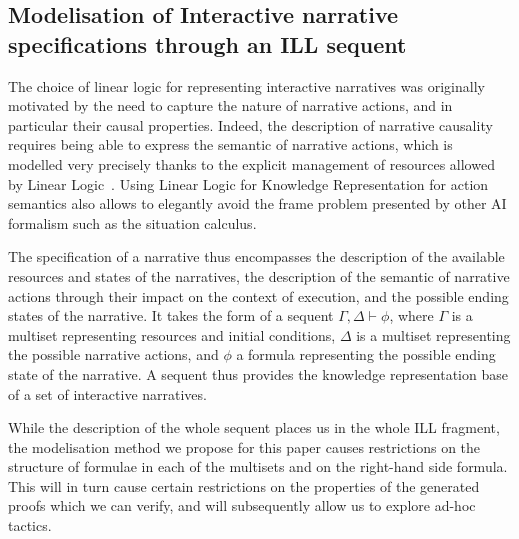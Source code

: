 \documentclass[runningheads,a4paper]{llncs}
\begin{document}
\subsection{Modelisation of Interactive narrative specifications through an ILL sequent}
The choice of linear logic for representing interactive narratives was originally motivated by the need to capture the nature of narrative actions, and in particular their causal properties. Indeed, the description of narrative causality requires being able to express the semantic of narrative actions, which is modelled very precisely thanks to the explicit management of resources allowed by Linear Logic~\cite{Bosser10}. Using Linear Logic for Knowledge Representation for action semantics also allows to elegantly avoid the frame problem presented by other AI formalism such as the situation calculus. 

The specification of a narrative thus encompasses the description of the available resources and states of the narratives, the description of the semantic of narrative actions through their impact on the context of execution, and the possible ending states of the narrative. It takes the form of a sequent $\Gamma , \Delta \vdash \phi$, where $\Gamma$ is a multiset representing resources and initial conditions, $\Delta$ is a multiset representing the possible narrative actions, and $\phi$ a formula representing the possible ending state of the narrative. A sequent thus provides the knowledge representation base of a set of interactive narratives. 

While the description of the whole sequent places us in the whole ILL fragment, the modelisation method we propose for this paper causes restrictions on the structure of formulae in each of the multisets and on the right-hand side formula. This will in turn cause certain restrictions on the properties of the generated proofs which we can verify, and will subsequently allow us to explore ad-hoc tactics.
\end{document}
